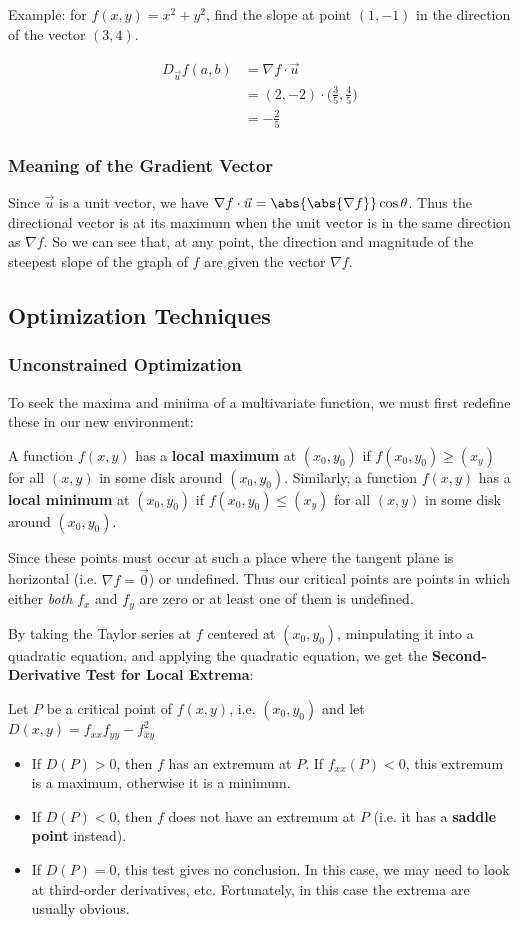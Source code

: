 \documentclass[12pt]{article}
\begin{document}
Example: for $f(x,y) = x^2 + y^2$, find the slope at point $(1,-1)$ in the direction of the vector $(3,4)$.

\begin{align*}
D_{\vec{u}} f(a,b) &= \nabla f \cdot \vec{u}\\
                   &= (2,-2) \cdot \bigl( \frac{3}{5}, \frac{4}{5} \bigl)\\
                   &= -\frac{2}{5}
\end{align*}

\subsubsection*{Meaning of the Gradient Vector}
Since $\vec{u}$ is a unit vector, we have $\nabla f \cdot \vec{u} = \abs{\abs{\nabla f}} \cos\theta$. Thus the directional vector is at its maximum when the unit vector is in the same direction as $\nabla f$. So we can see that, at any point, the direction and magnitude of the steepest slope of the graph of $f$ are given the vector $\nabla f$.

\subsection*{Optimization Techniques}
\subsubsection*{Unconstrained Optimization}
To seek the maxima and minima of a multivariate function, we must first redefine these in our new environment:

 A function $f(x,y)$ has a {\bf local maximum} at $(x_0, y_0)$ if $f(x_0, y_0) \geq (x_ y)$ for all $(x,y)$ in some disk around $(x_0,y_0)$. Similarly, a function $f(x,y)$ has a {\bf local minimum} at $(x_0, y_0)$ if $f(x_0, y_0) \leq (x_ y)$ for all $(x,y)$ in some disk around $(x_0,y_0)$.

Since these points must occur at such a place where the tangent plane is horizontal (i.e. $\nabla f = \vec{0}$) or undefined. Thus our critical points are points in which either \emph{both} $f_x$ and $f_y$ are zero or at least one of them is undefined.

By taking the Taylor series at $f$ centered at $(x_0,y_0)$, minpulating it into a quadratic equation, and applying the quadratic equation, we get the {\bf Second-Derivative Test for Local Extrema}:

Let $P$ be a critical point of $f(x,y)$, i.e. $(x_0,y_0)$ and let $D(x,y) = f_{xx}f_{yy} - f_{xy}^2$
\begin{itemize}
\item If $D(P) > 0$, then $f$ has an extremum at $P$. If $f_{xx}(P) < 0$, this extremum is a maximum, otherwise it is a minimum.
\item If $D(P) < 0$, then $f$ does not have an extremum at $P$ (i.e. it has a {\bf saddle point} instead).
\item If $D(P) = 0$, this test gives no conclusion. In this case, we may need to look at third-order derivatives, etc. Fortunately, in this case the extrema are usually obvious.
\end{itemize}
\end{document}
